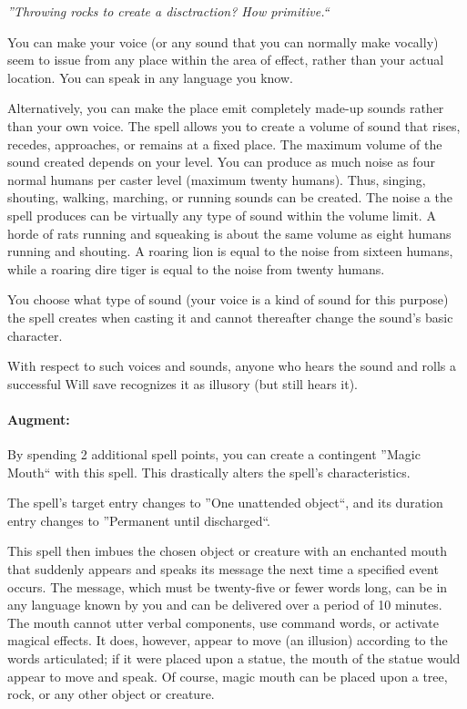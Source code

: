 \emph{''Throwing rocks to create a disctraction? How primitive.``}

You can make your voice (or any sound that you can normally make vocally) seem to issue from any place within the area of effect, rather than your actual location. 
You can speak in any language you know. 

Alternatively, you can make the place emit completely made-up sounds rather than your own voice.
The spell allows you to create a volume of sound that rises, recedes, approaches, or remains at a fixed place. 
The maximum volume of the sound created depends on your level. 
You can produce as much noise as four normal humans per caster level (maximum twenty humans). 
Thus, singing, shouting, walking, marching, or running sounds can be created. 
The noise a the spell produces can be virtually any type of sound within the volume limit. 
A horde of rats running and squeaking is about the same volume as eight humans running and shouting. 
A roaring lion is equal to the noise from sixteen humans, while a roaring dire tiger is equal to the noise from twenty humans.

You choose what type of sound (your voice is a kind of sound for this purpose) 
the spell creates when casting it and cannot thereafter change the sound's basic character.

With respect to such voices and sounds, anyone who hears the sound and rolls a successful Will save recognizes it as illusory (but still hears it).

\paragraph{Augment:} By spending 2 additional spell points, you can create a contingent ''Magic Mouth`` with this spell. 
This drastically alters the spell's characteristics.

The spell's target entry changes to ''One unattended object``, and its duration entry changes to ''Permanent until discharged``.

This spell then imbues the chosen object or creature with an enchanted mouth that suddenly appears and speaks its message the next time a specified event occurs. 
The message, which must be twenty-five or fewer words long, can be in any language known by you and can be delivered over a period of 10 minutes. 
The mouth cannot utter verbal components, use command words, or activate magical effects. 
It does, however, appear to move (an illusion) according to the words articulated; 
if it were placed upon a statue, the mouth of the statue would appear to move and speak.
Of course, magic mouth can be placed upon a tree, rock, or any other object or creature.


